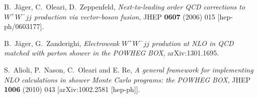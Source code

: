 \documentclass[a4paper,11pt]{article}
\begin{document}
%
\begin{thebibliography}{99}
 B.~J\"ager, C.~Oleari, D.~Zeppenfeld, {\em
    Next-to-leading order QCD corrections to $W^+W^-jj$ 
    production via vector-boson fusion},  JHEP {\bf 0607} (2006)
  015  [hep-ph/0603177].

 B.~J\"ager, G.~Zanderighi, {\em Electroweak $W^+W^-jj$ prodution at
  NLO in QCD matched with parton shower in the POWHEG BOX}, arXiv:1301.1695.
  
 S.~Alioli, P.~Nason, C.~Oleari and E. Re, {\em
    A general framework for implementing NLO calculations in shower
    Monte Carlo programs: the POWHEG BOX}, JHEP {\bf 1006} (2010)
  043  [arXiv:1002.2581 [hep-ph]].

\end{thebibliography}
\end{document}
